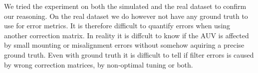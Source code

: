 We tried the experiment on both the simulated and the real dataset to confirm our reasoning. On the real dataset we do however not have any ground truth to use for error metrics. It is therefore difficult to quantify errors when using another correction matrix. In reality it is diffcult to know if the AUV is affected by small mounting or misalignment errors without somehow aquiring a precise ground truth. Even with ground truth it is difficult to tell if filter errors is caused by wrong correction matrices, by non-optimal tuning or both. 
